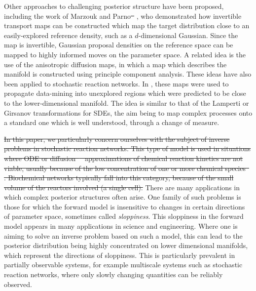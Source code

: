 \documentclass[final]{siamltex}
\newcommand{\edit}[1]{{\color{red} #1}}  %
\providecommand{\DIFadd}[1]{{\protect\color{blue}\uwave{#1}}} %
\providecommand{\DIFdel}[1]{{\protect\color{red}\sout{#1}}}                      %
\providecommand{\DIFaddbegin}{} %
\providecommand{\DIFaddend}{} %
\providecommand{\DIFdelbegin}{} %
\providecommand{\DIFdelend}{} %
\newcommand{\DIFscaledelfig}{0.5}
\newlength{\DIFdelgraphicswidth} %
\newlength{\DIFdelgraphicsheight} %
\newcommand{\DIFaddincludegraphics}[2][]{{\color{blue}\fbox{\DIFOincludegraphics[#1]{#2}}}} %
\newcommand{\DIFdelincludegraphics}[2][]{%
\sbox{\DIFdelgraphicsbox}{\DIFOincludegraphics[#1]{#2}}%
\settoboxwidth{\DIFdelgraphicswidth}{\DIFdelgraphicsbox} %
\settoboxtotalheight{\DIFdelgraphicsheight}{\DIFdelgraphicsbox} %
\scalebox{\DIFscaledelfig}{%
\parbox[b]{\DIFdelgraphicswidth}{\usebox{\DIFdelgraphicsbox}\\[-\baselineskip] \rule{\DIFdelgraphicswidth}{0em}}\llap{\resizebox{\DIFdelgraphicswidth}{\DIFdelgraphicsheight}{%
\setlength{\unitlength}{\DIFdelgraphicswidth}%
\begin{picture}(1,1)%
\thicklines\linethickness{2pt} %
{\color[rgb]{1,0,0}\put(0,0){\framebox(1,1){}}}%
{\color[rgb]{1,0,0}\put(0,0){\line( 1,1){1}}}%
{\color[rgb]{1,0,0}\put(0,1){\line(1,-1){1}}}%
\end{picture}%
}\hspace*{3pt}}} %
} %
\DeclareRobustCommand{\DIFaddbegin}{\DIFOaddbegin \let\includegraphics\DIFaddincludegraphics} %
\DeclareRobustCommand{\DIFaddend}{\DIFOaddend \let\includegraphics\DIFOincludegraphics} %
\DeclareRobustCommand{\DIFdelbegin}{\DIFOdelbegin \let\includegraphics\DIFdelincludegraphics} %
\DeclareRobustCommand{\DIFdelend}{\DIFOaddend \let\includegraphics\DIFOincludegraphics} %
\begin{document}
Other approaches to challenging posterior structure have been
proposed, including the work of Marzouk and Parno\DIFdelbegin \DIFdel{\mbox{%
\cite{parno2014transport}}\hspace{0pt}%
}\DIFdelend \DIFaddbegin \DIFadd{\mbox{%
\cite{parno2018transport}}\hspace{0pt}%
}\DIFaddend , who
demonstrated how invertible transport maps can be constructed which
map the target distribution close to an easily-explored reference
density, such as a $d$-dimensional Gaussian. Since the map is
invertible, Gaussian proposal densities on the reference space can be
mapped to highly informed moves on the parameter space. A related idea
is the use of the anisotropic diffusion maps\cite{singer2008non}, in
which a map which describes the manifold is constructed using
principle component analysis. These ideas have also been applied to
stochastic reaction
networks\cite{singer2009detecting,dsilva2016data}. In
\cite{chiavazzo2017intrinsic}, these maps were used to propagate
data-mining into unexplored regions which were predicted to be close
to the lower-dimensional manifold. The idea is similar to that of the
Lamperti or Girsanov transformations for SDEs\cite{flandrin2003stationarity,gardiner2009stochastic},  the aim being to map complex
processes onto a standard one which is well understood, through a
change of measure.

\DIFdelbegin \DIFdel{In this paper, we particularly concern ourselves with the subject of
inverse problems in stochastic reaction networks. This type of model
is used in situations where ODE or diffusion\mbox{%
\cite{gillespie2000chemical}
}\hspace{0pt}%
approximations of chemical reaction kinetics are not viable, usually
because of the low concentration of one or more chemical
species\mbox{%
\cite{gillespie1977exact}}\hspace{0pt}%
. Biochemical networks typically fall into
this category, because of the small volume of the reactors involved (a
single cell).
}\DIFdelend \DIFaddbegin \edit{
There are many applications in which complex posterior structures
often arise. One family of such problems is those for which the
forward model is insensitive to changes in certain directions of
parameter space, sometimes called
\emph{sloppiness}\cite{gutenkunst2007universally,apgar2010sloppy}. This
sloppiness in the forward model appears in many applications in
science and engineering\cite{constantine2014active}. Where one is
aiming to solve an inverse problem based on such a model, this can
lead to the posterior distribution being highly concentrated on lower
dimensional manifolds, which represent the directions of
sloppiness. This is particularly prevalent in partially observable
systems, for example multiscale systems such
as stochastic reaction networks, where only slowly changing quantities
can be reliably observed.}
\DIFaddend 
\end{document}
